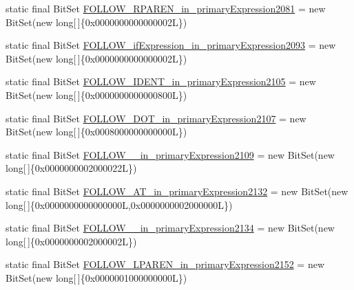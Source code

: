 \begin{DoxyCompactItemize}
\item 
static final Bit\-Set \hyperlink{classorg_1_1tzi_1_1use_1_1parser_1_1shell_1_1_shell_command_parser_a80548ac3284d4c16174987698bdcfd57}{F\-O\-L\-L\-O\-W\-\_\-\-R\-P\-A\-R\-E\-N\-\_\-in\-\_\-primary\-Expression2081} = new Bit\-Set(new long\mbox{[}$\,$\mbox{]}\{0x0000000000000002\-L\})
\item 
static final Bit\-Set \hyperlink{classorg_1_1tzi_1_1use_1_1parser_1_1shell_1_1_shell_command_parser_a23c89811a2a97ba00c840570a4eb1af6}{F\-O\-L\-L\-O\-W\-\_\-if\-Expression\-\_\-in\-\_\-primary\-Expression2093} = new Bit\-Set(new long\mbox{[}$\,$\mbox{]}\{0x0000000000000002\-L\})
\item 
static final Bit\-Set \hyperlink{classorg_1_1tzi_1_1use_1_1parser_1_1shell_1_1_shell_command_parser_aee8b0f52851f50b2f11078138d4c3162}{F\-O\-L\-L\-O\-W\-\_\-\-I\-D\-E\-N\-T\-\_\-in\-\_\-primary\-Expression2105} = new Bit\-Set(new long\mbox{[}$\,$\mbox{]}\{0x0000000000000800\-L\})
\item 
static final Bit\-Set \hyperlink{classorg_1_1tzi_1_1use_1_1parser_1_1shell_1_1_shell_command_parser_aecaffb172d630a2644f3083b2e57dd51}{F\-O\-L\-L\-O\-W\-\_\-\-D\-O\-T\-\_\-in\-\_\-primary\-Expression2107} = new Bit\-Set(new long\mbox{[}$\,$\mbox{]}\{0x0008000000000000\-L\})
\item 
static final Bit\-Set \hyperlink{classorg_1_1tzi_1_1use_1_1parser_1_1shell_1_1_shell_command_parser_a469306fae8b419bc7cc2e650d9b45636}{F\-O\-L\-L\-O\-W\-\_\-\_\-in\-\_\-primary\-Expression2109} = new Bit\-Set(new long\mbox{[}$\,$\mbox{]}\{0x0000000002000022\-L\})
\item 
static final Bit\-Set \hyperlink{classorg_1_1tzi_1_1use_1_1parser_1_1shell_1_1_shell_command_parser_ad7758ef3ed1c74d9b0d3ebb60e4afbcb}{F\-O\-L\-L\-O\-W\-\_\-\-A\-T\-\_\-in\-\_\-primary\-Expression2132} = new Bit\-Set(new long\mbox{[}$\,$\mbox{]}\{0x0000000000000000\-L,0x0000000002000000\-L\})
\item 
static final Bit\-Set \hyperlink{classorg_1_1tzi_1_1use_1_1parser_1_1shell_1_1_shell_command_parser_aaf927e067e2af24f29f4a8838126f602}{F\-O\-L\-L\-O\-W\-\_\-\_\-in\-\_\-primary\-Expression2134} = new Bit\-Set(new long\mbox{[}$\,$\mbox{]}\{0x0000000002000002\-L\})
\item 
static final Bit\-Set \hyperlink{classorg_1_1tzi_1_1use_1_1parser_1_1shell_1_1_shell_command_parser_a96f2820e5ea5a329fc04def108ba1fd6}{F\-O\-L\-L\-O\-W\-\_\-\-L\-P\-A\-R\-E\-N\-\_\-in\-\_\-primary\-Expression2152} = new Bit\-Set(new long\mbox{[}$\,$\mbox{]}\{0x0000001000000000\-L\})

\end{DoxyCompactItemize}
